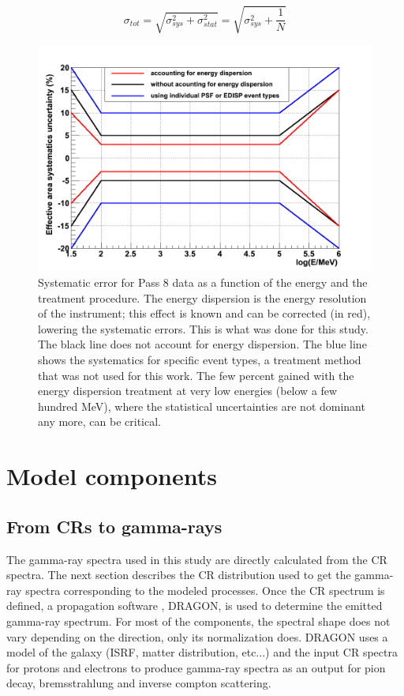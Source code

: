 \begin{equation}
\sigma_{tot} =\sqrt{\sigma_{sys}^2 + \sigma_{stat}^2} = \sqrt{\sigma_{sys}^2 + \frac{1}{N}}
\end{equation}


\begin{figure}[h]
 \centering
 \includegraphics[width=.6\linewidth]{pic/method/LAT_sys_error.png}
 \caption[Systematic errors for the Fermi LAT]{Systematic error for Pass 8 data as a function of the energy and the treatment procedure. The energy dispersion is the energy resolution of the instrument; this effect is known and can be corrected (in red), lowering the systematic errors. This is what was done for this study. The black line does not account for energy dispersion. The blue line shows the systematics for specific event types, a treatment method that was not used for this work. The few percent gained with the energy dispersion treatment at very low energies (below a few hundred MeV), where the statistical uncertainties are not dominant any more, can be critical.}
 \label{fig:LAT_sys_err}
\end{figure}




\newpage
\section{Model components}
\subsection{From CRs to gamma-rays}

The gamma-ray spectra used in this study are directly calculated from the CR spectra. The next section describes the CR distribution used to get the gamma-ray spectra corresponding to the modeled processes. Once the CR spectrum is defined, a propagation software \cite{Evoli2008}, DRAGON, is used to determine the emitted gamma-ray spectrum. For most of the components, the spectral shape does not vary depending on the direction, only its normalization does. %
DRAGON uses a model of the galaxy (ISRF, matter distribution, etc...) and the input CR spectra for protons and electrons to produce gamma-ray spectra as an output for pion decay, bremsstrahlung and inverse compton scattering.


